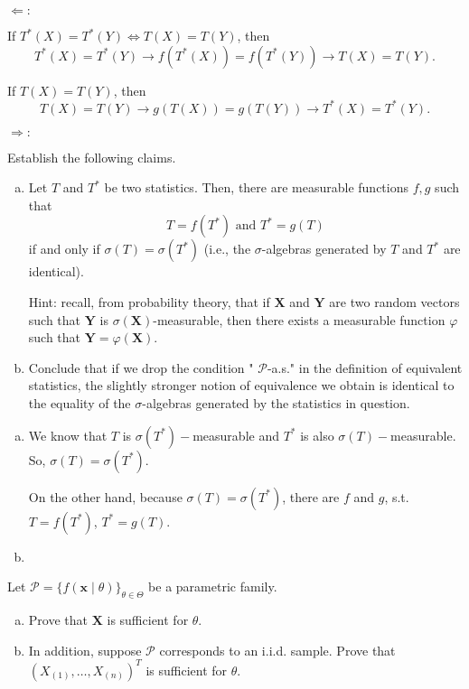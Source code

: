 \begin{solution}
    $\Leftarrow: $

    If $T^*(X)=T^*(Y)\Leftrightarrow T(X)=T(Y)$, then
    \[
        T^*(X)=T^*(Y)\rightarrow f(T^*(X))=f(T^*(Y))\rightarrow T(X)=T(Y). 
    \]

    If $T(X)=T(Y)$, then
    \[
        T(X)=T(Y)\rightarrow g(T(X))=g(T(Y))\rightarrow T^*(X)=T^*(Y). 
    \]

    $\Rightarrow: $
\end{solution}

\begin{ex}
    Establish the following claims. 
    \begin{enumerate}[(a)]
        \item Let \(T\) and \(T^{*}\) be two statistics. Then, there are measurable functions \(f, g\) such that 
        \[
            T=f\left(T^{*}\right)\text{ and }T^{*}=g(T)
        \]
        if and only if \(\sigma(T)=\sigma\left(T^{*}\right)\)
        (i.e., the \(\sigma\)-algebras generated by \(T\) and \(T^{*}\) are identical). 
        
        Hint: recall, from probability theory, that if \(\mathbf{X}\) and \(\mathbf{Y}\) are two random vectors such that \(\mathbf{Y}\) is \(\sigma(\mathbf{X})\)-measurable, then there exists a measurable function \(\varphi\) such that \(\mathbf{Y}=\varphi(\mathbf{X})\). 
        \item Conclude that if we drop the condition " \(\mathcal{P}\)-a.s." in the definition of equivalent statistics, the slightly stronger notion of equivalence we obtain is identical to the equality of the \(\sigma\)-algebras generated by the statistics in question. 
    \end{enumerate}
\end{ex}

\begin{solution}
    \begin{enumerate}[(a)]
        \item We know that $T$ is $\sigma(T^*)-$measurable and $T^*$ is also $\sigma(T)-$measurable. So, $\sigma(T)=\sigma(T^*)$. 
        
        On the other hand, because $\sigma(T)=\sigma(T^*)$, there are $f$ and $g$, s.t. $T=f(T^*)$, $T^*=g(T)$. 
        \item 
    \end{enumerate}
\end{solution}

\begin{ex}
    Let \(\mathcal{P}=\{f(\mathbf{x} \mid \theta)\}_{\theta \in \Theta}\) be a parametric family. 
    \begin{enumerate}[(a)]
        \item Prove that \(\mathbf{X}\) is sufficient for \(\theta\). 
        \item In addition, suppose \(\mathcal{P}\) corresponds to an i.i.d. sample. Prove that \(\left(X_{(1)}, \ldots, X_{(n)}\right)^T\) is sufficient for \(\theta\). 
    \end{enumerate}
\end{ex}

